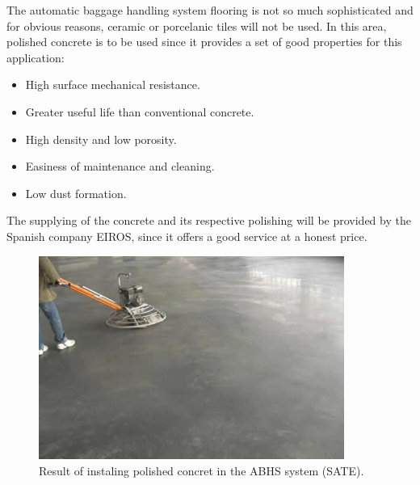 	The automatic baggage handling system flooring is not so much sophisticated and for obvious reasons, ceramic or porcelanic tiles will not be used. In this area, polished concrete is to be used since it provides a set of good properties for this application:
	\begin{itemize}
	\item High surface mechanical resistance.
	\item Greater useful life than conventional concrete.
	\item High density and low porosity.
	\item Easiness of maintenance and cleaning.
	\item Low dust formation.
	\end{itemize}
The supplying of the concrete and its respective polishing will be provided by the Spanish company EIROS, since it offers a good service at a honest price.

\begin{figure}[H]
	\centering
\includegraphics[width=10cm]{./images/Resultado5}
\caption{Result of instaling polished concret in the ABHS system (SATE).}
\end{figure}

		